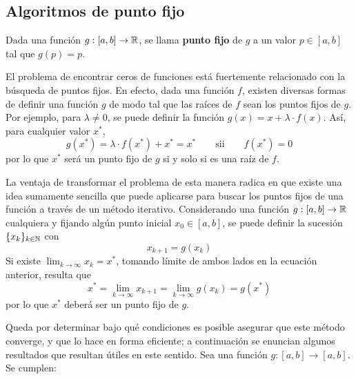 
\subsection{Algoritmos de punto fijo}

Dada una función $g : [a,b] \to \mathbb{R}$, se llama \textbf{punto fijo} de $g$ a
un valor $p \in [a,b]$ tal que $g(p) = p$.

El problema de encontrar ceros de funciones está fuertemente relacionado con
la búsqueda de puntos fijos. En efecto, dada una función $f$, existen diversas
formas de definir una función $g$ de modo tal que las raíces de $f$ sean los
puntos fijos de $g$. Por ejemplo, para $\lambda \neq 0$, se puede definir la
función $g(x) = x + \lambda \cdot f(x)$. Así, para cualquier valor $x^\ast$,
\[ g(x^\ast) = \lambda \cdot f(x^\ast) + x^\ast = x^\ast
    \qquad \text{sii} \qquad f(x^\ast) = 0 \]
por lo que $x^\ast$ será un punto fijo de $g$ si y solo si es una raíz de $f$.

La ventaja de transformar el problema de esta manera radica en que existe una
idea sumamente sencilla que puede aplicarse para buscar los puntos fijos de
una función a través de un método iterativo. Considerando una función $g :
[a,b] \to \mathbb{R}$ cualquiera y fijando algún punto inicial $x_0 \in [a,b]$, se
puede definir la sucesión $\lbrace x_k \rbrace_{k \in \mathbb{N}}$ con
\[ x_{k+1} = g(x_k) \]
Si existe $\lim_{k \to \infty} x_k = x^\ast$, tomando límite de ambos lados en
la ecuación anterior, resulta que
\[ x^\ast = \lim_{k \to \infty} x_{k+1} = \lim_{k \to \infty} g(x_k) = g(x^\ast) \]
por lo que $x^\ast$ deberá ser un punto fijo de $g$.

Queda por determinar bajo qué condiciones es posible asegurar que este método
converge, y que lo hace en forma eficiente; a continuación se enuncian algunos
resultados que resultan útiles en este sentido. Sea una función $g: [a,b] \to
[a,b]$. Se cumplen:

